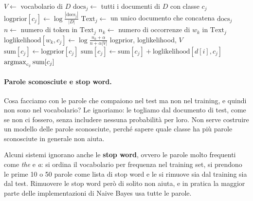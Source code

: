 \begin{algorithm}[htbp]
\caption{Addestramento e test di Naive Bayes multinomiale con add-$\alpha$ smoothing, nello spazio dei logaritmi.}
\label{alg:nb}
\begin{algorithmic}[1]
  \State $V \gets$ vocabolario di $D$
    \State $\text{docs}_j \gets$ tutti i documenti di $D$ con classe $c_j$
    \State $\text{logprior}[c_j] \gets \log \frac{|\text{docs}_j|}{|D|}$
    \State $\text{Text}_j \gets$ un unico documento che concatena $\text{docs}_j$
    \State $n \gets$ numero di token in $\text{Text}_j$
      \State $n_k \gets$ numero di occorrenze di $w_k$ in $\text{Text}_j$
      \State $\text{loglikelihood}[w_k, c_j] \gets \log \frac{n_k + \alpha}{n + \alpha|V|}$
    \EndFor
  \EndFor
  \State \Return logprior, loglikelihood, $V$
\EndFunction
{}
    \State $\text{sum}[c_j] \gets \text{logprior}[c_j]$
       
        \State $\text{sum}[c_j] \gets \text{sum}[c_j] + \text{loglikelihood}[d[i], c_j]$
      \EndIf
    \EndFor
  \EndFor
  \State \Return $\operatorname*{argmax}_{c_j} \text{sum}[c_j]$
\EndFunction
\end{algorithmic}
\end{algorithm}

\paragraph{Parole sconosciute e stop word.} Cosa facciamo con le parole che compaiono nel test ma non nel training, e quindi non sono nel vocabolario? Le ignoriamo: le togliamo dal documento di test, come se non ci fossero, senza includere nessuna probabilità per loro. Non serve costruire un modello delle parole sconosciute, perché sapere quale classe ha più parole sconosciute in generale non aiuta.

Alcuni sistemi ignorano anche le \textbf{stop word}, ovvero le parole molto frequenti come \textit{the} e \textit{a}: si ordina il vocabolario per frequenza nel training set, si prendono le prime 10 o 50 parole come lista di stop word e le si rimuove sia dal training sia dal test. Rimuovere le stop word però di solito non aiuta, e in pratica la maggior parte delle implementazioni di Naive Bayes usa tutte le parole.

